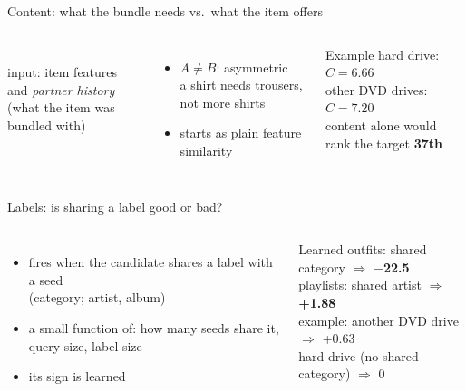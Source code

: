 \documentclass[aspectratio=169,11pt]{beamer}
\begin{document}
\begin{frame}{Content: what the bundle needs vs.\ what the item offers}
\begin{columns}[c]
\centering
{}\\[4pt]
{\scriptsize input: item features and \emph{partner history}\\ (what the item was bundled with)}
\begin{itemize}\small
\item $A\neq B$: \alert{asymmetric}\\ a shirt needs trousers, not more shirts
\item starts as plain feature similarity
\end{itemize}
\vspace{2mm}
\begin{block}{Example}\small
hard drive: $C=6.66$\\
other DVD drives: $C=7.20$\\
content alone would rank the target \textbf{37th}
\end{block}
\end{columns}
\end{frame}

\begin{frame}{Labels: is sharing a label good or bad?}
\begin{columns}[c]
\begin{itemize}
\item fires when the candidate \alert{shares a label} with a seed\\ (category; artist, album)
\item a small function of: how many seeds share it, query size, label size
\item its \alert{sign is learned}
\end{itemize}
\begin{block}{Learned}\small
outfits: shared category $\Rightarrow$ \textbf{$-$22.5}\\
playlists: shared artist $\Rightarrow$ \textbf{+1.88}\\[3pt]
example: another DVD drive $\Rightarrow$ +0.63\\
hard drive (no shared category) $\Rightarrow$ 0
\end{block}
\end{columns}
\end{frame}
\end{document}
